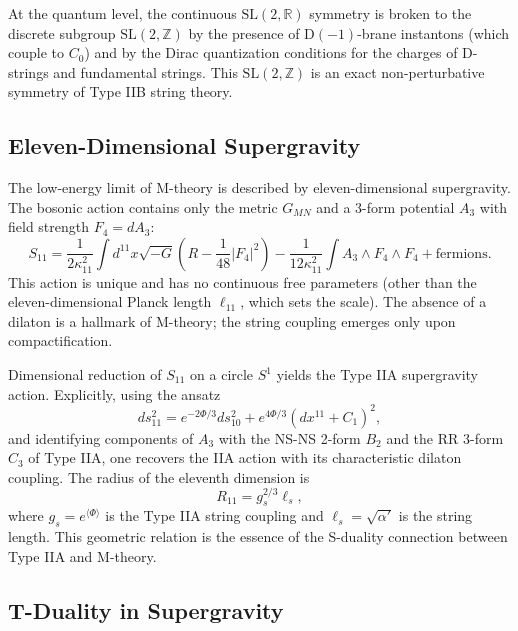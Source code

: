 \documentclass[11pt]{article}
\begin{document}
At the quantum level, the continuous $\mathrm{SL}(2,\mathbb{R})$ symmetry is broken to the discrete subgroup $\mathrm{SL}(2,\mathbb{Z})$ by the presence of D$(-1)$-brane instantons (which couple to $C_0$) and by the Dirac quantization conditions for the charges of D-strings and fundamental strings. This $\mathrm{SL}(2,\mathbb{Z})$ is an exact non-perturbative symmetry of Type IIB string theory.

\subsection{Eleven-Dimensional Supergravity}

The low-energy limit of M-theory is described by eleven-dimensional supergravity. The bosonic action contains only the metric $G_{MN}$ and a 3-form potential $A_3$ with field strength $F_4 = dA_3$:
\begin{equation}
S_{11} = \frac{1}{2\kappa_{11}^2} \int d^{11}x \sqrt{-G} \left( R - \frac{1}{48} |F_4|^2 \right) 
- \frac{1}{12\kappa_{11}^2} \int A_3 \wedge F_4 \wedge F_4 + \text{fermions}.
\end{equation}
This action is unique and has no continuous free parameters (other than the eleven-dimensional Planck length $\ell_{11}$, which sets the scale). The absence of a dilaton is a hallmark of M-theory; the string coupling emerges only upon compactification.

Dimensional reduction of $S_{11}$ on a circle $S^1$ yields the Type IIA supergravity action. Explicitly, using the ansatz
\begin{equation}
ds_{11}^2 = e^{-2\Phi/3} ds_{10}^2 + e^{4\Phi/3} (dx^{11} + C_1)^2,
\end{equation}
and identifying components of $A_3$ with the NS-NS 2-form $B_2$ and the RR 3-form $C_3$ of Type IIA, one recovers the IIA action with its characteristic dilaton coupling. The radius of the eleventh dimension is
\begin{equation}
R_{11} = g_s^{2/3} \ell_s,
\end{equation}
where $g_s = e^{\langle \Phi \rangle}$ is the Type IIA string coupling and $\ell_s = \sqrt{\alpha'}$ is the string length. This geometric relation is the essence of the S-duality connection between Type IIA and M-theory.

\subsection{T-Duality in Supergravity}
\end{document}

